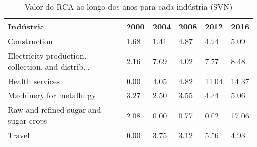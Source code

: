 \begin{table}
\centering
\caption{Valor do RCA ao longo dos anos para cada indústria (SVN)}
\label{tab:ex3-tempo-SVN}
\begin{tabular}{p{6cm}p{1.5cm}p{1.5cm}p{1.5cm}p{1.5cm}p{1.5cm}}
\toprule
                                         Indústria & 2000 & 2004 & 2008 &  2012 &  2016 \\
\midrule
                                      Construction & 1.68 & 1.41 & 4.87 &  4.24 &  5.09 \\
Electricity production, collection, and distrib... & 2.16 & 7.69 & 4.02 &  7.77 &  8.48 \\
                                   Health services & 0.00 & 4.05 & 4.82 & 11.04 & 14.37 \\
                          Machinery for metallurgy & 3.27 & 2.50 & 3.55 &  4.34 &  5.06 \\
             Raw and refined sugar and sugar crops & 2.08 & 0.00 & 0.77 &  0.02 & 17.06 \\
                                            Travel & 0.00 & 3.75 & 3.12 &  5.56 &  4.93 \\
\bottomrule
\end{tabular}
\end{table}
